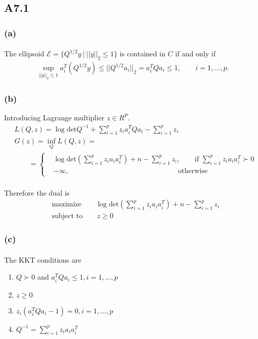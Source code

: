 \subsection*{A7.1}
\subsubsection*{(a)}
\paragraph{}
The ellipsoid $\mathcal{E} =\{ Q^{1/2}y\ |\ ||y||_2 \leq 1 \}$ is contained in $C$ if and only if
\begin{align*}
\sup_{||y||_2\leq 1} a_i^T(Q^{1/2}y) \leq ||Q^{1/2}a_i||_2 = a_i^TQa_i \leq 1,\qquad i =1,...,p.
\end{align*}
\subsubsection*{(b)}
Introducing Lagrange multiplier $z \in R^P$.
\begin{align*}
&L(Q,z) =\log \text{det}Q^{-1} +\sum_{i=1}^{p}z_ia_i^TQa_i - \sum_{i=1}^{p}z_i\\
&G(z) = \inf_Q L(Q,z) =\\
&\qquad = \begin{cases}
&\log\text{det}(\sum_{i=1}^{p}z_ia_ia_i^T) +n -\sum_{i=1}^{p}z_i, \qquad \text{if }  \sum_{i=1}^{p}z_ia_ia_i^T \succ 0 \\
& -\infty, \qquad\qquad\qquad\qquad\qquad\qquad\qquad\quad\ \text{otherwise}
\end{cases}
\end{align*}
\paragraph{}
Therefore the dual is 
\begin{align*}
&\text{maximize}\qquad \log\text{det}(\sum_{i=1}^{p}z_ia_ia_i^T) +n -\sum_{i=1}^{p}z_i\\
&\text{subject to}\qquad z \geq 0
\end{align*}
\subsubsection*{(c)}
\paragraph{}
The KKT conditions are
\begin{enumerate}
	\item $Q\succ 0$ and $a_i^TQa_i \leq 1, i=1,...,p$
	\item $z \geq 0$
	\item $z_i(a_i^TQa_i -1) =0, i=1,...,p$
	\item $Q^{-1} = \sum_{i=1}^{p}z_ia_ia_i^T$
\end{enumerate}
